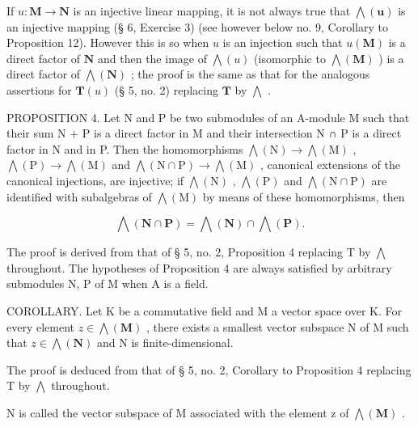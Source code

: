 If \(u: \mathbf{M} \to \mathbf{N}\) is an injective linear mapping, it is not always true that \(\bigwedge(\mathbf{u})\) is an injective mapping (§ 6, Exercise 3) (see however below no. 9, Corollary to Proposition 12). However this is so when \(u\) is an injection such that \(u(\mathbf{M})\) is a direct factor of \(\mathbf{N}\) and then the image of \(\bigwedge(u)\) (isomorphic to \(\bigwedge(\mathbf{M})\) ) is a direct factor of \(\bigwedge(\mathbf{N})\) ; the proof is the same as that for the analogous assertions for \(\mathbf{T}(u)\) (§ 5, no. 2) replacing \(\mathbf{T}\) by \(\bigwedge\) .

PROPOSITION 4. Let N and P be two submodules of an A-module M such that their sum N + P is a direct factor in M and their intersection N ∩ P is a direct factor in N and in P. Then the homomorphisms \(\bigwedge(\mathrm{N}) \to \bigwedge(\mathrm{M})\) , \(\bigwedge(\mathrm{P}) \to \bigwedge(\mathrm{M})\) and \(\bigwedge(\mathrm{N} \cap \mathrm{P}) \to \bigwedge(\mathrm{M})\) , canonical extensions of the canonical injections, are injective; if \(\bigwedge(\mathrm{N})\) , \(\bigwedge(\mathrm{P})\) and \(\bigwedge(\mathrm{N} \cap \mathrm{P})\) are identified with subalgebras of \(\bigwedge(\mathrm{M})\) by means of these homomorphisms, then

\[
\bigwedge (\mathbf {N} \cap \mathbf {P}) = \bigwedge (\mathbf {N}) \cap \bigwedge (\mathbf {P}).\tag{5}
\]

The proof is derived from that of § 5, no. 2, Proposition 4 replacing T by \(\bigwedge\) throughout. The hypotheses of Proposition 4 are always satisfied by arbitrary submodules N, P of M when A is a field.

COROLLARY. Let K be a commutative field and M a vector space over K. For every element \(z \in \bigwedge(\mathbf{M})\) , there exists a smallest vector subspace N of M such that \(z \in \bigwedge(\mathbf{N})\) and N is finite-dimensional.

The proof is deduced from that of § 5, no. 2, Corollary to Proposition 4 replacing T by \(\bigwedge\) throughout.

N is called the vector subspace of M associated with the element z of \(\bigwedge(\mathbf{M})\) .

